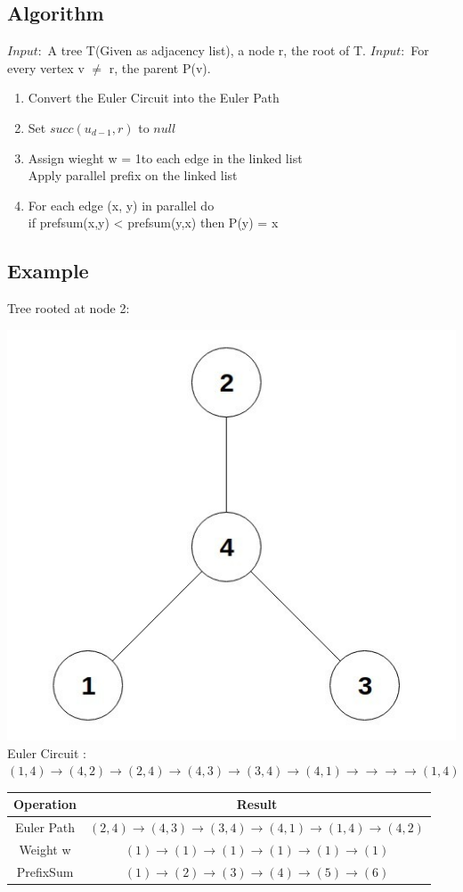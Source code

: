 \documentclass[twoside]{article}
\begin{document}
\subsection{Algorithm}
$Input: $ A tree T(Given as adjacency list), a node r, the root of T.
$Input: $ For every vertex v $\neq$ r, the parent P(v).

\begin{enumerate}
\item Convert the Euler Circuit into the Euler Path
\item Set $succ(u_{d-1}, r)$ to $null$
\item Assign wieght w = 1to each edge in the linked list\\
Apply parallel prefix on the linked list
\item For each edge (x, y) in parallel do \\
\indent if prefsum(x,y) < prefsum(y,x) then P(y) = x \\
\end{enumerate}

\subsection{Example}
Tree rooted at node 2:\\
\begin{center}
\includegraphics[scale=0.25]{g2} \\
Euler Circuit : $(1,4)\to(4,2)\to(2,4)\to(4,3)\to(3,4)\to(4,1)\to\to\to\to(1,4)$
\end{center}

\begin{center}
 \begin{tabular}{||c c||} 
 \hline
    Operation & Result \\
 \hline
 	Euler Path & $(2,4)\to(4,3)\to(3,4)\to(4,1)\to(1,4)\to(4,2)$ \\ 
 \hline
 	Weight w & $(1)\to(1)\to(1)\to(1)\to(1)\to(1)$ \\
 \hline
 	PrefixSum & $(1)\to(2)\to(3)\to(4)\to(5)\to(6)$ \\
 \hline
\end{tabular}
\end{center}
\end{document}
